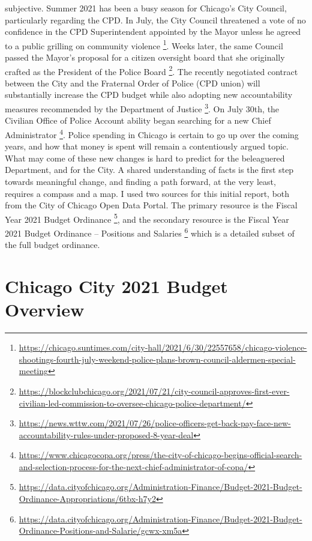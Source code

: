 \documentclass[
]{article}
\begin{document}
subjective. \setlength{\parindent}{5ex} Summer 2021 has been a busy
season for Chicago's City Council, particularly regarding the CPD. In
July, the City Council threatened a vote of no confidence in the CPD
Superintendent appointed by the Mayor unless he agreed to a public
grilling on community violence \footnote{\url{https://chicago.suntimes.com/city-hall/2021/6/30/22557658/chicago-violence-shootings-fourth-july-weekend-police-plans-brown-council-aldermen-special-meeting}}.
Weeks later, the same Council passed the Mayor's proposal for a citizen
oversight board that she originally crafted as the President of the
Police Board \footnote{\url{https://blockclubchicago.org/2021/07/21/city-council-approves-first-ever-civilian-led-commission-to-oversee-chicago-police-department/}}.
The recently negotiated contract between the City and the Fraternal
Order of Police (CPD union) will substantially increase the CPD budget
while also adopting new accountability measures recommended by the
Department of Justice \footnote{\url{https://news.wttw.com/2021/07/26/police-officers-get-back-pay-face-new-accountability-rules-under-proposed-8-year-deal}}.
On July 30th, the Civilian Office of Police Account ability began
searching for a new Chief Administrator \footnote{\url{https://www.chicagocopa.org/press/the-city-of-chicago-begins-official-search-and-selection-process-for-the-next-chief-administrator-of-copa/}}.
Police spending in Chicago is certain to go up over the coming years,
and how that money is spent will remain a contentiously argued topic.
\setlength{\parindent}{5ex} What may come of these new changes is hard
to predict for the beleaguered Department, and for the City. A shared
understanding of facts is the first step towards meaningful change, and
finding a path forward, at the very least, requires a compass and a map.
I used two sources for this initial report, both from the City of
Chicago Open Data Portal. The primary resource is the Fiscal Year 2021
Budget Ordinance \footnote{\url{https://data.cityofchicago.org/Administration-Finance/Budget-2021-Budget-Ordinance-Appropriations/6tbx-h7y2}},
and the secondary resource is the Fiscal Year 2021 Budget Ordinance --
Positions and Salaries \footnote{\url{https://data.cityofchicago.org/Administration-Finance/Budget-2021-Budget-Ordinance-Positions-and-Salarie/gcwx-xm5a}}
which is a detailed subset of the full budget ordinance.

\hypertarget{chicago-city-2021-budget-overview}{%
\section{Chicago City 2021 Budget
Overview}\label{chicago-city-2021-budget-overview}}
\end{document}
